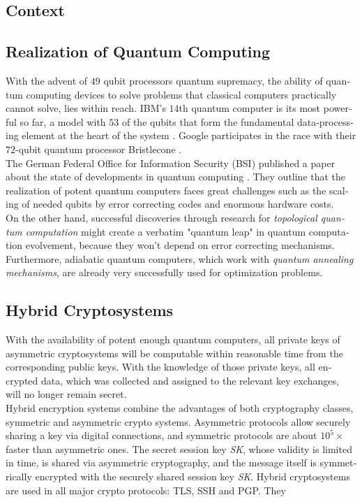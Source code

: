\documentclass[a4paper,11pt]{article}
\begin{document}
\begin{otherlanguage}{english}
\section{Context}

\subsection{Realization of Quantum Computing}

\noindent
With the advent of $49$ qubit processors quantum supremacy, the ability of quantum computing devices to solve problems that classical computers practically cannot solve,  lies within reach. IBM's $14$th quantum computer is its most powerful so far, a model with $53$ of the qubits that form the fundamental data-processing element at the heart of the system \cite{MSN}. Google participates in the race with their $72$-qubit quantum processor Bristlecone \cite{googleai}. \\

\noindent
The German Federal Office for Information Security (BSI) published a paper about the state of developments in quantum computing \cite{BSI}. They outline that the realization of potent quantum computers faces great challenges such as the scaling of needed qubits by error correcting codes and enormous hardware costs. \\
On the other hand, successful discoveries through research for \textit{topological quantum computation} \cite{TQB} might create a verbatim "quantum leap" in quantum computation evolvement, because they won't depend on error correcting mechanisms. Furthermore, adiabatic quantum computers, which work with \textit{quantum annealing mechanisms}, are already very successfully used for optimization problems.\\

\subsection{Hybrid Cryptosystems}

\noindent
With the availability of potent enough quantum computers, all private keys of asymmetric cryptosystems will be computable within reasonable time from the corresponding public keys. With the knowledge of those private keys, all encrypted data, which was collected and assigned to the relevant key exchanges, will no longer remain secret. \\

\noindent
Hybrid encryption systems combine the advantages of both cryptography classes, symmetric and asymmetric crypto systems. Asymmetric protocols allow securely sharing a key via digital connections, and symmetric protocols are about $10^5 \times$ faster than asymmetric ones. The secret session key \textit{SK}, whose validity is limited in time, is shared via asymmetric cryptography, and the message itself is symmetrically encrypted with the securely shared session key \textit{SK}. Hybrid cryptosystems are used in all major crypto protocols: TLS, SSH and PGP. They\\


\end{otherlanguage}
\end{document}
